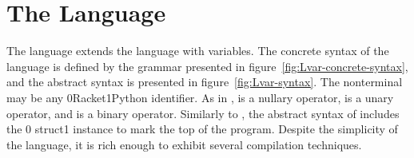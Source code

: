 \documentclass[7x10]{TimesAPriori_MIT}%
\def\racketEd{0}
\def\pythonEd{1}
\providecommand{\BookEdition}{1}
\let\edition\BookEdition
\newcommand{\racket}[1]{{\if\edition\racketEd{#1}\fi}}
\newcommand{\pythonColor}[0]{}
\newcommand{\python}[1]{{\if\edition\pythonEd\pythonColor #1\fi}}
\numberwithin{theorem}{chapter}
\numberwithin{definition}{chapter}
\numberwithin{equation}{chapter}
\begin{document}
\section{The \LangVar{} Language}
\label{sec:s0}

The \LangVar{} language extends the \LangInt{} language with
variables.  The concrete syntax of the \LangVar{} language is defined
by the grammar presented in figure~\ref{fig:Lvar-concrete-syntax}, and
the abstract syntax is presented in figure~\ref{fig:Lvar-syntax}.  The
nonterminal \Var{} may be any \racket{Racket}\python{Python}
identifier.  As in \LangInt{}, \READOP{} is a nullary operator,
\key{-} is a unary operator, and \key{+} is a binary operator.
Similarly to \LangInt{}, the abstract syntax of \LangVar{} includes the
\racket{ struct}\python{ instance} to mark
the top of the program.
Despite the simplicity of the \LangVar{} language, it is rich enough to
exhibit several compilation techniques.

\newcommand{\LvarGrammarRacket}{
  \begin{array}{rcl}
    \Exp &::=& \Var \MID \CLET{\Var}{\Exp}{\Exp}
  \end{array}
}
\newcommand{\LvarASTRacket}{
  \begin{array}{rcl}
    \Exp &::=& \VAR{\Var} \MID \LET{\Var}{\Exp}{\Exp} 
  \end{array}
}
\newcommand{\LvarGrammarPython}{
\begin{array}{rcl}
  \Exp &::=& \Var{} \\
  \Stmt &::=& \Var\mathop{\key{=}}\Exp
\end{array}
}
\newcommand{\LvarASTPython}{
  \begin{array}{rcl}
\Exp{} &::=& \VAR{\Var{}} \\
\Stmt{} &::=& \ASSIGN{\VAR{\Var}}{\Exp}
  \end{array}
}
  
\end{document}
